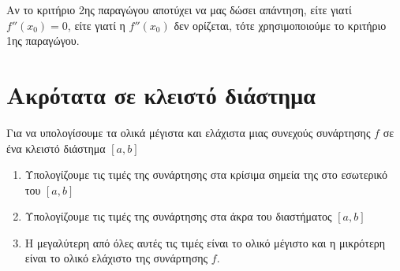     \begin{rem}
    Αν το κριτήριο 2ης παραγώγου αποτύχει να μας δώσει απάντηση, είτε γιατί $ f''(x_{0}) = 0 $, είτε
    γιατί η $ f''(x_{0}) $ δεν ορίζεται, τότε χρησιμοποιούμε το κριτήριο 1ης παραγώγου.
    \end{rem}


    \section*{Ακρότατα σε κλειστό διάστημα}

    Για να υπολογίσουμε τα ολικά μέγιστα και ελάχιστα μιας συνεχούς συνάρτησης $f$ σε ένα κλειστό διάστημα
    $ [a,b] $
    \begin{enumerate}
        \item Υπολογίζουμε τις τιμές της συνάρτησης στα κρίσιμα σημεία της στο εσωτερικό του $ [a,b]
            $
        \item Υπολογίζουμε τις τιμές της συνάρτησης στα άκρα του διαστήματος $ [a,b] $
        \item Η μεγαλύτερη από όλες αυτές τις τιμές είναι το ολικό μέγιστο και η μικρότερη είναι το
            ολικό ελάχιστο της συνάρτησης $f$.
    \end{enumerate}




